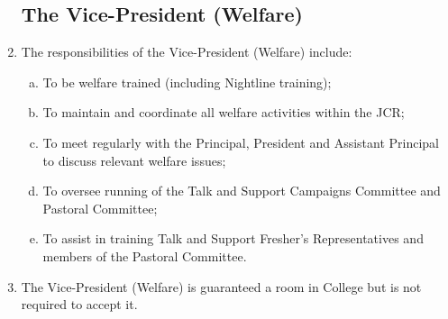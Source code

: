 \documentclass[12pt]{article}  %
\begin{document}
\begin{enumerate}
    \subsection{The Vice-President (Welfare)}
    \item The responsibilities of the Vice-President (Welfare) include:
    \begin{enumerate}[(a)]
        \item To be welfare trained (including Nightline training);
        \item To maintain and coordinate all welfare activities within the JCR;
        \item To meet regularly with the Principal, President and Assistant Principal to discuss relevant welfare issues;
        \item To oversee running of the Talk and Support Campaigns Committee and Pastoral Committee;
        \item To assist in training Talk and Support Fresher's Representatives and members of the Pastoral Committee.
    \end{enumerate}
    \item The Vice-President (Welfare) is guaranteed a room in College but is not required to accept it.

\end{enumerate}
\end{document}
